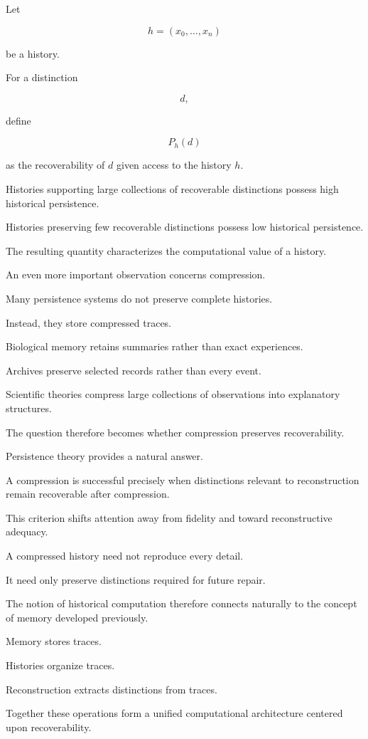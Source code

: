 \documentclass[12pt,oneside]{article}
\theoremstyle{definition}
\begin{document}
Let

\[
h
=
(x_0,\ldots,x_n)
\]

be a history.

For a distinction

\[
d,
\]

define

\[
P_h(d)
\]

as the recoverability of \(d\) given access to the history \(h\).

Histories supporting large collections of recoverable distinctions possess high historical persistence.

Histories preserving few recoverable distinctions possess low historical persistence.

The resulting quantity characterizes the computational value of a history.

An even more important observation concerns compression.

Many persistence systems do not preserve complete histories.

Instead, they store compressed traces.

Biological memory retains summaries rather than exact experiences.

Archives preserve selected records rather than every event.

Scientific theories compress large collections of observations into explanatory structures.

The question therefore becomes whether compression preserves recoverability.

Persistence theory provides a natural answer.

A compression is successful precisely when distinctions relevant to reconstruction remain recoverable after compression.

This criterion shifts attention away from fidelity and toward reconstructive adequacy.

A compressed history need not reproduce every detail.

It need only preserve distinctions required for future repair.

The notion of historical computation therefore connects naturally to the concept of memory developed previously.

Memory stores traces.

Histories organize traces.

Reconstruction extracts distinctions from traces.

Together these operations form a unified computational architecture centered upon recoverability.
\end{document}
